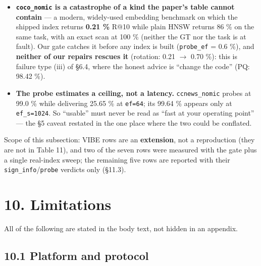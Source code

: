 \documentclass[
  10pt,
]{article}
\providecommand{\tightlist}{%
  \setlength{\itemsep}{0pt}\setlength{\parskip}{0pt}}
\begin{document}
\begin{itemize}
\tightlist
\item
  \textbf{\texttt{coco\_nomic} is a catastrophe of a kind the paper's
  table cannot contain} --- a modern, widely-used embedding benchmark on
  which the shipped index returns \textbf{0.21 \%} R@10 while plain HNSW
  returns 86 \% on the same task, with an exact scan at 100 \% (neither
  the GT nor the task is at fault). Our gate catches it before any index
  is built (\texttt{probe\_ef} = 0.6 \%), and \textbf{neither of our
  repairs rescues it} (rotation: 0.21 $\rightarrow$ 0.70 \%): this is failure type
  (iii) of §6.4, where the honest advice is ``change the code'' (PQ:
  98.42 \%).
\item
  \textbf{The probe estimates a ceiling, not a latency.}
  \texttt{ccnews\_nomic} probes at 99.0 \% while delivering 25.65 \% at
  \texttt{ef=64}; its 99.64 \% appears only at \texttt{ef\_s=1024}. So
  ``usable'' must never be read as ``fast at your operating point'' ---
  the §5 caveat restated in the one place where the two could be
  conflated.
\end{itemize}

Scope of this subsection: VIBE rows are an \textbf{extension}, not a
reproduction (they are not in Table 11), and two of the seven rows were
measured with the gate plus a single real-index sweep; the remaining
five rows are reported with their \texttt{sign\_info}/\texttt{probe}
verdicts only (§11.3).

\section{10. Limitations}\label{limitations}

All of the following are stated in the body text, not hidden in an
appendix.

\subsection{10.1 Platform and protocol}\label{platform-and-protocol}
\end{document}
